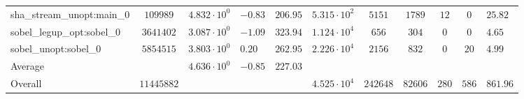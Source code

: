 \begin{tabular}{|l|c|HHc|c|c|c|c|cH|}
sha\_stream\_unopt:main\_0                      & $ 109989   $ & $ 4.832 \cdot 10^{0} $ & $ -0.83 $ & $ 206.95 $ & $ 5.315 \cdot 10^{2}  $ & $ 5151   $ & $ 1789  $ & $ 12  $ & $ 0   $ & $ 25.82   $ \\
sobel\_legup\_opt:sobel\_0                      & $ 3641402  $ & $ 3.087 \cdot 10^{0} $ & $ -1.09 $ & $ 323.94 $ & $ 1.124 \cdot 10^{4}  $ & $ 656    $ & $ 304   $ & $ 0   $ & $ 0   $ & $ 4.65    $ \\
sobel\_unopt:sobel\_0                           & $ 5854515  $ & $ 3.803 \cdot 10^{0} $ & $ 0.20  $ & $ 262.95 $ & $ 2.226 \cdot 10^{4}  $ & $ 2156   $ & $ 832   $ & $ 0   $ & $ 20  $ & $ 4.99    $ \\
\hline
Average                                         & $          $ & $ 4.636 \cdot 10^{0} $ & $ -0.85 $ & $ 227.03 $ & $                     $ & $        $ & $       $ & $     $ & $     $ & $         $ \\
\hline
Overall                                         & $ 11445882 $ & $                    $ & $       $ & $        $ & $ 4.525 \cdot 10^{4}  $ & $ 242648 $ & $ 82606 $ & $ 280 $ & $ 586 $ & $ 861.96  $ \\
\hline
\end{tabular}
